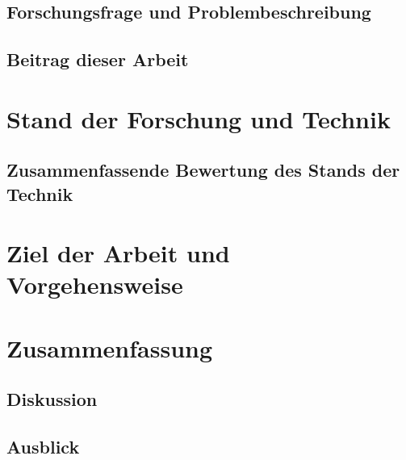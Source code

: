 \documentclass[%
english, ngerman,%
twoside, %
toc=bib,
BCOR=6mm, %
]{isw_smb_diss} %
\numberwithin{equation}{chapter} %
\begin{document}
\section{Forschungsfrage und Problembeschreibung}
\section{Beitrag dieser Arbeit}

\chapter{Stand der Forschung und Technik}
\section{Zusammenfassende Bewertung des Stands der Technik}

\chapter{Ziel der Arbeit und Vorgehensweise}



\chapter{Zusammenfassung}
\section{Diskussion}
\section{Ausblick}

\nocite{*}

\setlength{\emergencystretch}{.5em}
\printbibliography[title={Literatur}]





\cleardoublepage
\appendix
\renewcommand{\thesection}{\Alph{section}} %
\renewcommand\thefigure{\thesection\arabic{figure}}
\renewcommand\thetable{\thesection\arabic{table}}
\end{document}
